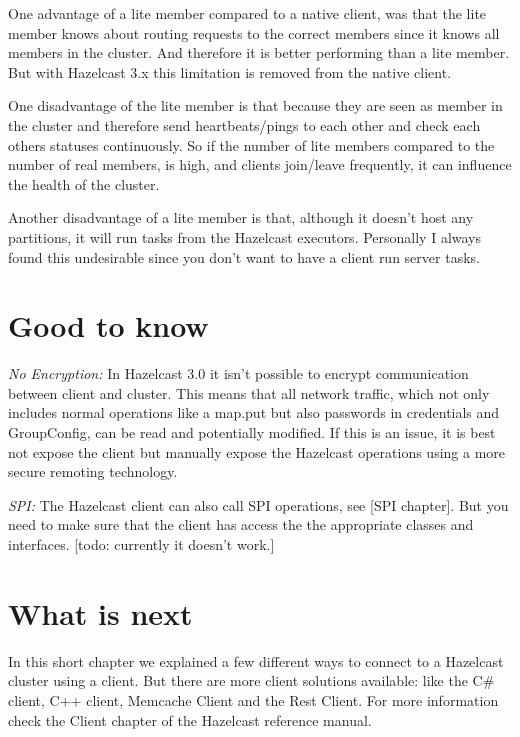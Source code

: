 One advantage of a lite member compared to a native client, was that the lite member knows about routing requests to the correct members since it knows all members in the cluster. And therefore it is better performing than a lite member. But with Hazelcast 3.x this limitation is removed from the native client.

One disadvantage of the lite member is that because they are seen as member in the cluster and therefore send heartbeats/pings to each other and check each others statuses continuously. So if the number of lite members compared to the number of real members, is high, and clients join/leave frequently, it can influence the health of the cluster. 

Another disadvantage of a lite member is that, although it doesn't host any partitions, it will run tasks from the Hazelcast executors. Personally I always found this undesirable since you don't want to have a client run server tasks.

\section{Good to know}

\emph{No Encryption:} In Hazelcast 3.0 it isn't possible to encrypt communication between client and cluster. This means that all network traffic, which not only includes normal operations like a map.put but also passwords in credentials and GroupConfig, can be read and potentially modified. If this is an issue, it is best not expose the client but manually expose the Hazelcast operations using a more secure remoting technology. 

\emph{SPI:} The Hazelcast client can also call SPI operations, see [SPI chapter]. But you need to make sure that the client has access the the appropriate classes and interfaces.  [todo: currently it doesn't work.]

\section{What is next}
In this short chapter we explained a few different ways to connect to a Hazelcast cluster using a client. But there are more client solutions available: like the C\# client, C++ client, Memcache Client and the Rest Client. For more information check the Client chapter of the Hazelcast reference manual.